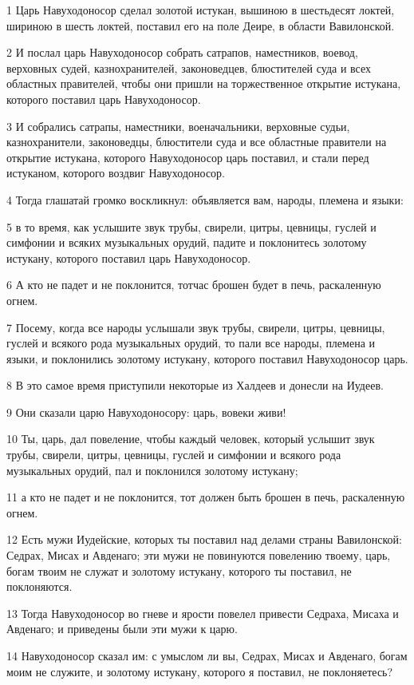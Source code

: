 \par 1 Царь Навуходоносор сделал золотой истукан, вышиною в шестьдесят локтей, шириною в шесть локтей, поставил его на поле Деире, в области Вавилонской.
\par 2 И послал царь Навуходоносор собрать сатрапов, наместников, воевод, верховных судей, казнохранителей, законоведцев, блюстителей суда и всех областных правителей, чтобы они пришли на торжественное открытие истукана, которого поставил царь Навуходоносор.
\par 3 И собрались сатрапы, наместники, военачальники, верховные судьи, казнохранители, законоведцы, блюстители суда и все областные правители на открытие истукана, которого Навуходоносор царь поставил, и стали перед истуканом, которого воздвиг Навуходоносор.
\par 4 Тогда глашатай громко воскликнул: объявляется вам, народы, племена и языки:
\par 5 в то время, как услышите звук трубы, свирели, цитры, цевницы, гуслей и симфонии и всяких музыкальных орудий, падите и поклонитесь золотому истукану, которого поставил царь Навуходоносор.
\par 6 А кто не падет и не поклонится, тотчас брошен будет в печь, раскаленную огнем.
\par 7 Посему, когда все народы услышали звук трубы, свирели, цитры, цевницы, гуслей и всякого рода музыкальных орудий, то пали все народы, племена и языки, и поклонились золотому истукану, которого поставил Навуходоносор царь.
\par 8 В это самое время приступили некоторые из Халдеев и донесли на Иудеев.
\par 9 Они сказали царю Навуходоносору: царь, вовеки живи!
\par 10 Ты, царь, дал повеление, чтобы каждый человек, который услышит звук трубы, свирели, цитры, цевницы, гуслей и симфонии и всякого рода музыкальных орудий, пал и поклонился золотому истукану;
\par 11 а кто не падет и не поклонится, тот должен быть брошен в печь, раскаленную огнем.
\par 12 Есть мужи Иудейские, которых ты поставил над делами страны Вавилонской: Седрах, Мисах и Авденаго; эти мужи не повинуются повелению твоему, царь, богам твоим не служат и золотому истукану, которого ты поставил, не поклоняются.
\par 13 Тогда Навуходоносор во гневе и ярости повелел привести Седраха, Мисаха и Авденаго; и приведены были эти мужи к царю.
\par 14 Навуходоносор сказал им: с умыслом ли вы, Седрах, Мисах и Авденаго, богам моим не служите, и золотому истукану, которого я поставил, не поклоняетесь?
